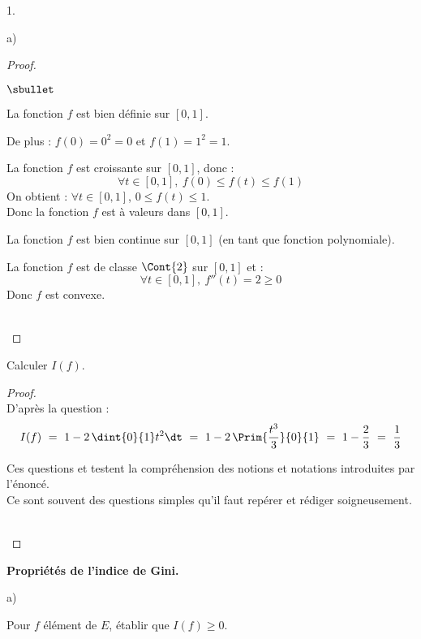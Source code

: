 \documentclass[11pt]{article}%
\begin{document}
\begin{noliste}{1.}
\begin{noliste}{a)}
  \begin{proof}~
    \begin{noliste}{$\sbullet$}
      \item La fonction $f$ est bien définie sur $[0,1]$.
      \item De plus : $f(0)=0^2=0$ et $f(1)=1^2=1$.
      \item La fonction $f$ est croissante sur $[0,1]$, donc :
      \[
        \forall t \in [0,1], \ f(0) \leq f(t) \leq f(1)
      \]
      On obtient : $\forall t \in [0,1]$, $0 \leq f(t) \leq 1$.\\
      Donc la fonction $f$ est à valeurs dans $[0,1]$.
      \item La fonction $f$ est bien continue sur $[0,1]$ (en tant 
      que fonction polynomiale).
      \item La fonction $f$ est de classe $\Cont{2}$ sur $[0,1]$ et :
      \[
        \forall t \in [0,1], \ f''(t)=2 \geq 0
      \]
      Donc $f$ est convexe.
    \end{noliste}
    ~\\[-1cm]
  \end{proof}

  
  \item Calculer $I(f)$. 
  
  \begin{proof}~\\
    D'après la question  :
    \[
      I(f) \ = \ 1-2 \, \dint{0}{1} t^2\dt \ = \ 1- 2 \, 
      \Prim{\dfrac{t^3}{3}}
      {0}{1} \ = \ 1-\dfrac{2}{3} \ = \ \dfrac{1}{3}
    \]
    
    \begin{remark}
      Ces questions  et  testent la 
      compréhension des notions et notations introduites par l'énoncé.\\
      Ce sont souvent des questions simples qu'il faut repérer et 
      rédiger soigneusement.
    \end{remark}~\\[-1.4cm]
  \end{proof}
 \end{noliste}
 
 \item \textbf{Propriétés de l'indice de Gini.}
 \begin{noliste}{a)}
  \item Pour $f$ élément de $E$, établir que $I(f) \geq 0$. 
  

\end{noliste}
\end{noliste}
\end{document}
